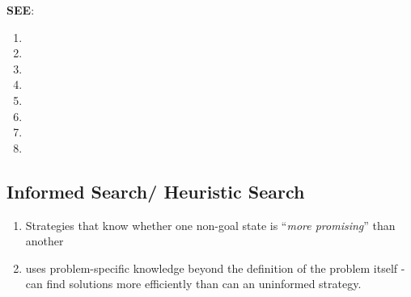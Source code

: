 \vspace{0.3cm}

\textbf{SEE}:
\begin{enumerate}
    \item {}
    \item {}
    \item {}
    \item {}
    \item {}
    \item {}
    \item {}
    \item {}
\end{enumerate}




\subsection{Informed Search/ Heuristic Search}

\begin{enumerate}
    \item Strategies that know whether one non-goal state is “\textit{more promising}” than another 
    \hfill \cite{ai/book/Artificial-Intelligence-A-Modern-Approach/Russell-Norvig}

    \item uses problem-specific knowledge beyond the definition of the problem itself - can find solutions more efficiently than can an uninformed strategy.
    \hfill \cite{ai/book/Artificial-Intelligence-A-Modern-Approach/Russell-Norvig}

    
\end{enumerate}














